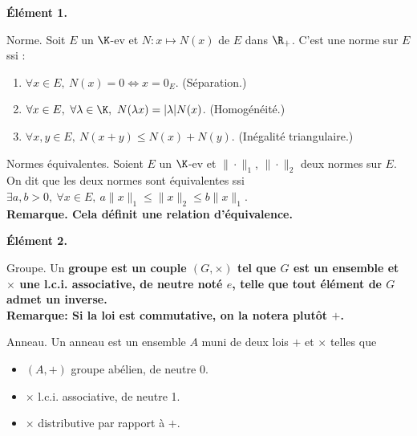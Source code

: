 \documentclass[11pt]{article}
\begin{document}


\thispagestyle{fancy}

\begin{center}
    \bf{Élément 1.}
\end{center}

\begin{defi}{Norme.}{}
    Soit $E$ un $\K$-ev et $N:x\mapsto N(x)$ de $E$ dans $\R_+$. C'est une norme sur $E$ ssi :
    \begin{enumerate}
        \item $\forall x \in E, ~ N(x)=0 \iff x = 0_E$. (Séparation.)
        \item $\forall x \in E, ~ \forall \lambda \in \K, ~ N(\lambda x) = |\lambda|N(x)$. (Homogénéité.)
        \item $\forall x,y \in E, ~ N(x+y) \leq N(x) + N(y)$. (Inégalité triangulaire.)
    \end{enumerate}
\end{defi}

\begin{defi}{Normes équivalentes.}{}
    Soient $E$ un $\K$-ev et $\|\cdot\|_1$, $\|\cdot\|_2$ deux normes sur $E$.\\
    On dit que les deux normes sont équivalentes ssi $\exists a,b > 0, ~ \forall x \in E, ~ a\|x\|_1\leq\|x\|_2\leq b\|x\|_1$.\\
    \bf{Remarque.} Cela définit une relation d'équivalence.
\end{defi}

\begin{center}
    \bf{Élément 2.}
\end{center}

\begin{defi}{Groupe.}{}
    Un \bf{groupe} est un couple $(G,\times)$ tel que $G$ est un ensemble et $\times$ une l.c.i. associative, de neutre noté $e$, telle que tout élément de $G$ admet un inverse.\\
    \bf{Remarque:} Si la loi est commutative, on la notera plutôt $+$.
\end{defi}

\begin{defi}{Anneau.}{}
    Un anneau est un ensemble $A$ muni de deux lois $+$ et $\times$ telles que
    \begin{itemize}
        \item $(A,+)$ groupe abélien, de neutre $0$.
        \item $\times$ l.c.i. associative, de neutre 1.
        \item $\times$ distributive par rapport à $+$.
    \end{itemize}
\end{defi}
\end{document}
